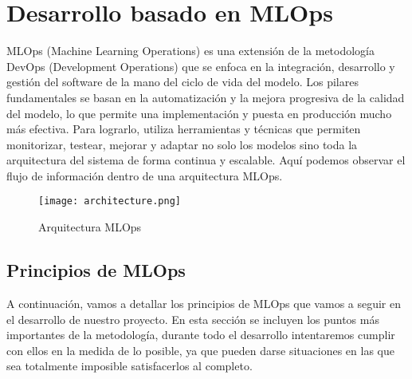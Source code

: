 \section{Desarrollo basado en MLOps}
MLOps (Machine Learning Operations) es una extensión de la metodología DevOps (Development Operations)
que se enfoca en la integración, desarrollo y gestión del software de la mano del ciclo de vida del modelo.
Los pilares fundamentales se basan en la automatización y la mejora progresiva de la calidad del modelo,
lo que permite una implementación y puesta en producción mucho más efectiva. Para lograrlo, utiliza herramientas
y técnicas que permiten monitorizar, testear, mejorar y adaptar no solo los modelos sino toda la arquitectura
del sistema de forma continua y escalable. Aquí podemos observar el flujo de información dentro de una
arquitectura MLOps.

\begin{figure}[ht]
    \centering
    \texttt{[image: architecture.png]}
    \caption{Arquitectura MLOps}
    \label{fig:architecure-mlops}
\end{figure}

\subsection{Principios de MLOps}
A continuación, vamos a detallar los principios de MLOps que vamos a seguir en el desarrollo de nuestro proyecto.
En esta sección se incluyen los puntos más importantes de la metodología, durante todo el desarrollo intentaremos
cumplir con ellos en la medida de lo posible, ya que pueden darse situaciones en las que sea totalmente imposible
satisfacerlos al completo.

